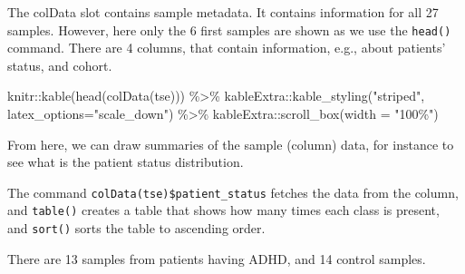 \documentclass[
  oneside]{book}
\newenvironment{Shaded}{\begin{snugshade}}{\end{snugshade}}
\newcommand{\AttributeTok}[1]{\textcolor[rgb]{0.77,0.63,0.00}{#1}}
\newcommand{\FunctionTok}[1]{\textcolor[rgb]{0.00,0.00,0.00}{#1}}
\newcommand{\NormalTok}[1]{#1}
\newcommand{\SpecialCharTok}[1]{\textcolor[rgb]{0.00,0.00,0.00}{#1}}
\newcommand{\StringTok}[1]{\textcolor[rgb]{0.31,0.60,0.02}{#1}}
\begin{document}
The colData slot contains sample metadata. It contains information for all 27 samples.
However, here only the 6 first samples are shown as we use the \texttt{head()} command. There
are 4 columns, that contain information, e.g., about patients' status, and cohort.

\begin{Shaded}
\begin{Highlighting}[]
\NormalTok{knitr}\SpecialCharTok{::}\FunctionTok{kable}\NormalTok{(}\FunctionTok{head}\NormalTok{(}\FunctionTok{colData}\NormalTok{(tse))) }\SpecialCharTok{\%\textgreater{}\%} 
\NormalTok{  kableExtra}\SpecialCharTok{::}\FunctionTok{kable\_styling}\NormalTok{(}\StringTok{"striped"}\NormalTok{, }
                            \AttributeTok{latex\_options=}\StringTok{"scale\_down"}\NormalTok{) }\SpecialCharTok{\%\textgreater{}\%} 
\NormalTok{  kableExtra}\SpecialCharTok{::}\FunctionTok{scroll\_box}\NormalTok{(}\AttributeTok{width =} \StringTok{"100\%"}\NormalTok{)}
\end{Highlighting}
\end{Shaded}

\begin{table}
\centering
{}
\end{table}

From here, we can draw summaries of the sample (column) data, for
instance to see what is the patient status distribution.

The command \texttt{colData(tse)\$patient\_status} fetches the data from the
column, and \texttt{table()} creates a table that shows how many times each
class is present, and \texttt{sort()} sorts the table to ascending order.

There are 13
samples from patients having ADHD,
and 14 control samples.
\end{document}
